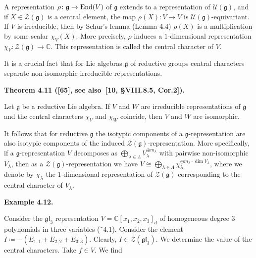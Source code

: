 A representation $\rho\colon\mathfrak{g}\to\textnormal{End}(V)$ of $\mathfrak{g}$ extends to a representation of $\mathcal{U}(\mathfrak{g})$, and if $X\in\mathcal{Z}(\mathfrak{g})$ is a central element, the map $\rho(X):V\to V$ is $\mathcal{U}(\mathfrak{g})$-equivariant. If $V$ is irreducible, then by Schur’s lemma (Lemma 4.4) $\rho(X)$ is a multiplication by some scalar $\chi_{V}(X)$. More precisely, $\rho$ induces a $1$-dimensional representation $\chi_{V}:\mathcal{Z}(\mathfrak{g})\to\mathbb{C}$. This representation is called the central character of $V$.





It is a crucial fact that for Lie algebras $\mathfrak{g}$ of reductive groups central characters separate non-isomorphic irreducible representations.





\par\medskip\noindent\textbf{Theorem 4.11 ([65], see also [10, §VIII.8.5, Cor.2]).}\par



Let $\mathfrak{g}$ be a reductive Lie algebra.
If $V$ and $W$ are irreducible representations of $\mathfrak{g}$ and the central characters $\chi_{V}$ and $\chi_{W}$ coincide, then $V$ and $W$ are isomorphic.






It follows that for reductive $\mathfrak{g}$ the isotypic components of a $\mathfrak{g}$-representation are also isotypic components of the induced $\mathcal{Z}(\mathfrak{g})$-representation.
More specifically, if a $\mathfrak{g}$-representation $V$ decomposes as $\bigoplus_{\lambda\in\Lambda}V_{\lambda}^{\oplus m_{\lambda}}$ with pairwise non-isomorphic $V_{\lambda}$, then as a $\mathcal{Z}(\mathfrak{g})$-representation we have $V\cong\bigoplus_{\lambda\in\Lambda}\chi_{\lambda}^{\oplus m_{\lambda}\cdot\dim V_{\lambda}}$, where we denote by $\chi_{\lambda}$ the $1$-dimensional representation of $\mathcal{Z}(\mathfrak{g})$ corresponding to the central character of $V_{\lambda}$.





\par\medskip\noindent\textbf{Example 4.12.}\par



Consider the $\mathfrak{gl}_{3}$ representation $V=\mathbb{C}[x_{1},x_{2},x_{3}]_{d}$ of homogeneous degree 3 polynomials in three variables (˜4.1). Consider the element $I\coloneqq-(E_{1,1}+E_{2,2}+E_{3,3})$.
Clearly, $I\in\mathcal{Z}(\mathfrak{gl}_{3})$. We determine the value of the central characters. Take $f\in V$.
We find



